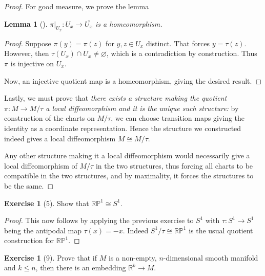 \documentclass[reqno]{amsart}
\newtheorem{lemma}[theorem]{Lemma}
\theoremstyle{definition}
\newtheorem{exercise}[theorem]{Exercise}
\theoremstyle{remark}
\begin{document}
\begin{proof}
    For good measure, we prove the lemma

    \begin{lemma}[]
        $\pi|_{U_x} \colon U_x \to \overline{U_x}$ is a
        homeomorphism.
    \end{lemma}
    \begin{proof}
        Suppose $\pi(y) = \pi(z)$ for $y,z \in U_x$ distinct.
        That forces $y = \tau(z)$. However, then
        $\tau(U_x) \cap U_x \neq \varnothing$, which
        is a contradiction by construction. Thus $\pi$ is
        injective on $U_x$.
        
        Now, an injective quotient map
        is a homeomorphism, giving the desired result.
    \end{proof}

    Lastly, we must prove that
    \textit{there exists a structure making the quotient
    $\pi \colon M \to  M / \tau$ a local diffeomorphism and it
    is the unique such structure:} 
    by construction of the charts on
    $M / \tau$, we can choose transition maps
    giving the identity as a coordinate representation.
    Hence the structure we constructed indeed gives
    a local diffeomorphism $M \cong M / \tau$.

    Any other structure making it a local diffeomorphism
    would necessarily give a local diffeomorphism
    of $M / \tau$ in the two structures, thus
    forcing all charts to be compatible in the two structures,
    and by maximality, it forces the structures
    to be the same.
\end{proof}

\begin{exercise}[5]
    Show that $\mathbb{R}\mathbb{P}^{1} \cong S^{1}$.
\end{exercise}
\begin{proof}
    This now follows by applying the
    previous exercise to $S^{1}$ with
    $\tau \colon S^{1} \to S^{1}$ being
    the antipodal map
    $\tau(x) = -x$. Indeed $S^{1} / \tau \cong \mathbb{R}\mathbb{P}^{1}
    $ is the usual quotient construction for $\mathbb{R}\mathbb{P}^{1}$.
\end{proof}



\begin{exercise}[9]
    Prove that if $M$ is a non-empty, $n$-dimensional 
    smooth manifold
    and $k\le n$, then there is an embedding
    $\mathbb{R}^{k} \to M$.
\end{exercise}
\end{document}

